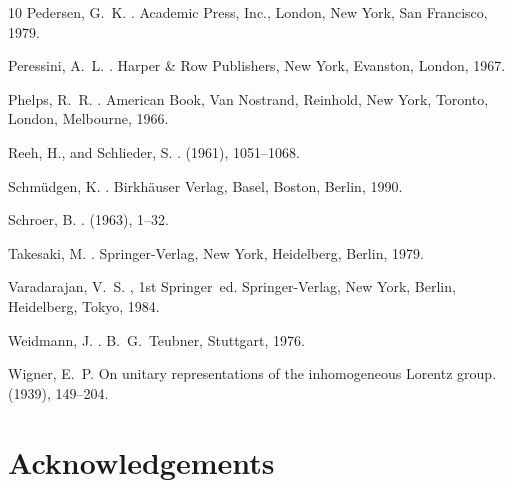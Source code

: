 \documentclass[11pt,twoside,openright]{report}
\theoremstyle{definition}
\theoremstyle{plain}
\theoremstyle{remark}
\theoremstyle{assumption}
\begin{document}
\begin{thebibliography}{10}
{\sc Pedersen, G.~K.}
.
\newblock Academic Press, Inc., London, New York, San Francisco, 1979.

{\sc Peressini, A.~L.}
.
\newblock Harper \& Row Publishers, New York, Evanston, London, 1967.

{\sc Phelps, R.~R.}
.
\newblock American Book, Van Nostrand, Reinhold, New York, Toronto, London,
  Melbourne, 1966.

{\sc Reeh, H., and Schlieder, S.}
.
 (1961), 1051--1068.

{\sc Schm\"{u}dgen, K.}
.
\newblock Birkh\"{a}user Verlag, Basel, Boston, Berlin, 1990.

{\sc Schroer, B.}
.
 (1963), 1--32.

{\sc Takesaki, M.}
.
\newblock Springer-Verlag, New York, Heidelberg, Berlin, 1979.

{\sc Varadarajan, V.~S.}
, 1st
  {Springer}~ed.
\newblock Springer-Verlag, New York, Berlin, Heidelberg, Tokyo, 1984.

{\sc Weidmann, J.}
.
\newblock B.~G.~Teubner, Stuttgart, 1976.

{\sc Wigner, E.~P.}
\newblock On unitary representations of the inhomogeneous {Lorentz} group.
 (1939), 149--204.

\end{thebibliography}


\cleardoublepage



\chapter*{Acknowledgements}
  \label{chap-acknowledgements}
\end{document}
